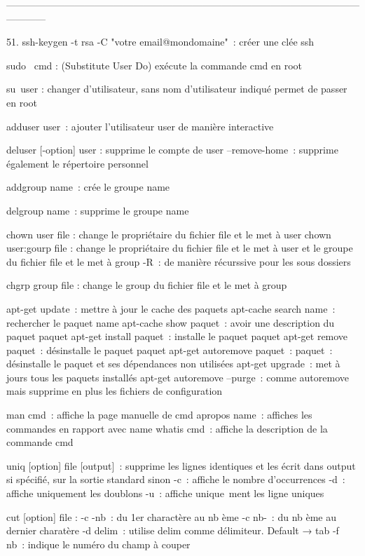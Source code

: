 \documentclass[a4paper, 10pt, onecolumn, openright, oneside]{book}
\begin{document}
{{------------------------------------------------------------------------------------------------------------------------

    51. ssh-keygen -t rsa -C "votre email@mondomaine" : créer une clée ssh



sudo  cmd : (Substitute User Do) exécute la commande cmd en root

su user : changer d’utilisateur, sans nom d’utilisateur indiqué permet de passer en root

adduser user : ajouter l’utilisateur user de manière interactive

deluser [-option] user : supprime le compte de user
--remove-home : supprime également le répertoire personnel

addgroup name : crée le groupe name

delgroup name : supprime le groupe name

chown user file : change le propriétaire du fichier file et le met à user
chown user:gourp file : change le propriétaire du fichier file et le met à user et le groupe du fichier file et le met à group
-R : de manière récurssive pour les sous dossiers

chgrp group file : change le group du fichier file et le met à group

apt-get update : mettre à jour le cache des paquets
apt-cache search name : rechercher le paquet name
apt-cache show paquet : avoir une description du paquet paquet
apt-get install paquet : installe le paquet paquet
apt-get remove paquet : désinstalle le paquet paquet
apt-get autoremove paquet : paquet : désinstalle le paquet et ses dépendances non utilisées
apt-get upgrade : met à jours tous les paquets installés
apt-get autoremove –purge : comme  autoremove mais supprime en plus les fichiers de configuration

man cmd : affiche la page manuelle de cmd
apropos name : affiches les commandes en rapport avec name
whatis cmd : affiche la description de la commande cmd

uniq [option] file [output] : supprime les lignes identiques et les écrit dans output si spécifié, sur la sortie standard sinon
-c : affiche le nombre d’occurrences
-d : affiche uniquement les doublons
-u : affiche unique ment les ligne uniques

cut [option] file :
-c -nb : du 1er charactère au nb ème  
-c nb- : du nb ème au dernier charatère
-d delim : utilise delim comme délimiteur. Default → tab
-f nb : indique le numéro du champ à couper

}}
\end{document}
